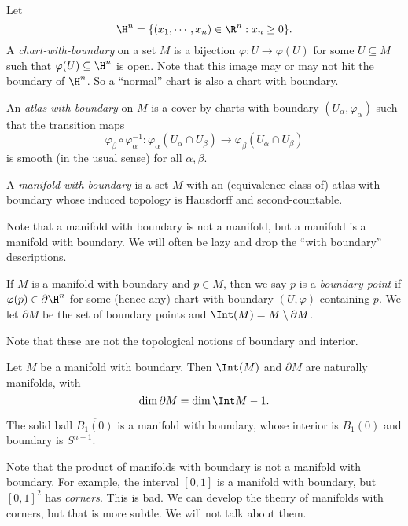 \documentclass[a4paper]{article}
\begin{document}
\begin{defi}
  Let
  \[
    \H^n = \{(x_1, \cdots, x_n)\in \R^n: x_n \geq 0\}.
  \]
  A \emph{chart-with-boundary} on a set $M$ is a bijection $\varphi: U \to \varphi(U)$ for some $U \subseteq M$ such that $\varphi(U) \subseteq \H^n$ is open. Note that this image may or may not hit the boundary of $\H^n$. So a ``normal'' chart is also a chart with boundary.

  An \emph{atlas-with-boundary} on $M$ is a cover by charts-with-boundary $(U_\alpha, \varphi_\alpha)$ such that the transition maps
  \[
    \varphi_\beta \circ \varphi_\alpha^{-1}: \varphi_\alpha(U_\alpha \cap U_\beta) \to \varphi_\beta(U_\alpha \cap U_\beta)
  \]
  is smooth (in the usual sense) for all $\alpha, \beta$.

  A \emph{manifold-with-boundary} is a set $M$ with an (equivalence class of) atlas with boundary whose induced topology is Hausdorff and second-countable.
\end{defi}

Note that a manifold with boundary is not a manifold, but a manifold is a manifold with boundary. We will often be lazy and drop the ``with boundary'' descriptions.

\begin{defi}
  If $M$ is a manifold with boundary and $p \in M$, then we say $p$ is a \emph{boundary point} if $\varphi(p) \in \partial \H^n$ for some (hence any) chart-with-boundary $(U, \varphi)$ containing $p$. We let $\partial M$ be the set of boundary points and $\Int(M) = M \setminus \partial M$.
\end{defi}

Note that these are not the topological notions of boundary and interior.

\begin{prop}
  Let $M$ be a manifold with boundary. Then $\Int(M)$ and $\partial M$ are naturally manifolds, with
  \[
    \dim \partial M = \dim \Int M - 1.
  \]
\end{prop}

\begin{eg}
  The solid ball $\overline{B_1(0)}$ is a manifold with boundary, whose interior is $B_1(0)$ and boundary is $S^{n - 1}$.
\end{eg}

Note that the product of manifolds with boundary is not a manifold with boundary. For example, the interval $[0, 1]$ is a manifold with boundary, but $[0, 1]^2$ has \emph{corners}. This is bad. We can develop the theory of manifolds with corners, but that is more subtle. We will not talk about them.
\end{document}
